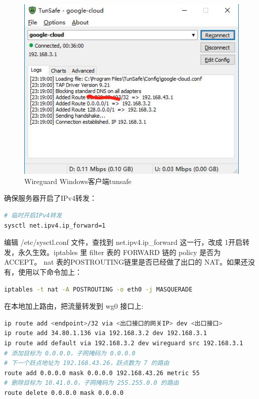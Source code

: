 \documentclass[8pt]{book}
\numberwithin{dummy}{section}
\theoremstyle{ocrenumbox}
\theoremstyle{blacknumex}
\theoremstyle{blacknumbox}
\theoremstyle{ocrenum}
\begin{document}
\begin{figure}[htbp]
	\centering
	\includegraphics[scale=0.7]{wireguardtunsafeclient.jpg}
	\caption{Wireguard Windows客户端tunsafe}
	\label{fig:wireguardtunsafeclient}
\end{figure}

确保服务器开启了IPv4转发：

\begin{lstlisting}[language=Bash]
# 临时开启IPv4转发
sysctl net.ipv4.ip_forward=1
\end{lstlisting}

编辑 /etc/sysctl.conf 文件，查找到 net.ipv4.ip\_forward 这一行，改成 1开启转发，永久生效。iptables 里 filter 表的 FORWARD 链的 policy 是否为 ACCEPT。 nat 表的POSTROUTING链里是否已经做了出口的 NAT。如果还没有，使用以下命令加上：

\begin{lstlisting}[language=Bash]
iptables -t nat -A POSTROUTING -o eth0 -j MASQUERADE
\end{lstlisting}

在本地加上路由，把流量转发到 wg0 接口上:

\begin{lstlisting}[language=Bash]
ip route add <endpoint>/32 via <出口接口的网关IP> dev <出口接口>
ip route add 34.80.1.136 via 192.168.3.2 dev 192.168.3.1
ip route add default via 192.168.3.2 dev wireguard src 192.168.3.1
# 添加目标为 0.0.0.0，子网掩码为 0.0.0.0
# 下一个跃点地址为 192.168.43.26，跃点数为 7 的路由
route add 0.0.0.0 mask 0.0.0.0 192.168.43.26 metric 55
# 删除目标为 10.41.0.0，子网掩码为 255.255.0.0 的路由
route delete 0.0.0.0 mask 0.0.0.0
\end{lstlisting}
\end{document}
